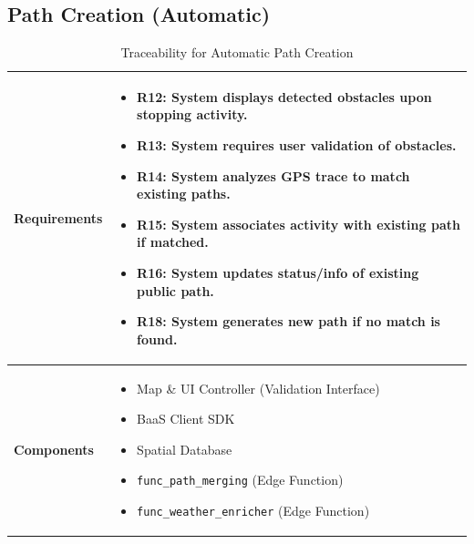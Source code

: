 \subsection{Path Creation (Automatic)}
\begin{table}[H]
    \centering
    \renewcommand{\arraystretch}{1.5}
    \begin{tabular}{|p{}|p{}|}
        \hline
        \textbf{Requirements} & 
        \begin{itemize}[nosep, leftmargin=*, label={}, before=\vspace{-0.6\baselineskip}, after=\strut]
            \item \textbf{R12:} System displays detected obstacles upon stopping activity.
            \item \textbf{R13:} System requires user validation of obstacles.
            \item \textbf{R14:} System analyzes GPS trace to match existing paths.
            \item \textbf{R15:} System associates activity with existing path if matched.
            \item \textbf{R16:} System updates status/info of existing public path.
            \item \textbf{R18:} System generates new path if no match is found.
        \end{itemize} \\
        \hline
        \textbf{Components} & 
        \begin{itemize}[nosep, leftmargin=*, before=\vspace{-0.6\baselineskip}, after=\strut]
            \item Map \& UI Controller (Validation Interface)
            \item BaaS Client SDK
            \item Spatial Database
            \item \texttt{func\_path\_merging} (Edge Function)
            \item \texttt{func\_weather\_enricher} (Edge Function)
        \end{itemize} \\
        \hline
    \end{tabular}
    \caption{Traceability for Automatic Path Creation}
\end{table}

